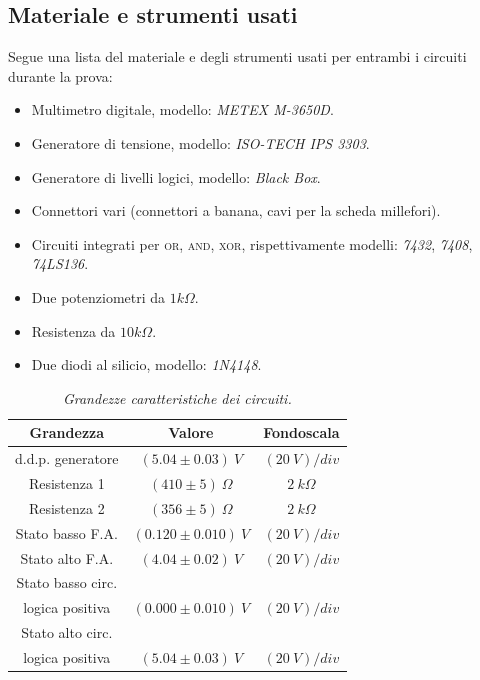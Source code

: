 \subsection{Materiale e strumenti usati}\label{subsec:materiali}
Segue una lista del materiale e degli strumenti usati per entrambi i circuiti durante la prova:
\begin{itemize}
  \item%
  Multimetro digitale, modello: \emph{METEX M-3650D}.
  \item%
  Generatore di tensione, modello: \emph{ISO-TECH IPS 3303}.
  \item%
  Generatore di livelli logici, modello: \emph{Black Box}. %
  \item%
  Connettori vari (connettori a banana, cavi per la scheda millefori).
  \item%
  Circuiti integrati per \textsc{or}, \textsc{and}, \textsc{xor}, rispettivamente modelli: \emph{7432}, \emph{7408}, \emph{74LS136}.
  \item%
  Due potenziometri da $1k\Omega$.
  \item%
  Resistenza da $10k\Omega$.
  \item%
  Due diodi al silicio, modello: \emph{1N4148}.
\end{itemize}

\begin{table}[H]
  \centering
  \begin{tabular}[t]{c | c  c }
    \hline
    Grandezza & Valore & Fondoscala \\
    \hline
    d.d.p. generatore & $(5.04 \pm 0.03) \: V$ & $(20 \: V)/div$ \\
    Resistenza 1 & $(410 \pm 5) \: \Omega$ & $2 \: k\Omega$ \\
    Resistenza 2 & $(356 \pm 5) \: \Omega$ & $2 \: k\Omega$ \\
    Stato basso F.A. & $(0.120 \pm 0.010) \: V$ & $(20 \: V)/div$ \\
    Stato alto F.A. & $(4.04 \pm 0.02) \: V$ & $(20 \: V)/div$ \\
    Stato basso circ.\\ logica positiva & $(0.000 \pm 0.010) \: V$ & $(20 \: V)/div$ \\
    Stato alto circ.\\ logica positiva & $(5.04 \pm 0.03) \: V$ & $(20 \: V)/div$ \\
    \hline
  \end{tabular}
  \caption{\emph{Grandezze caratteristiche dei circuiti.}}
  \label{tab:livelli-logici}
\end{table}
